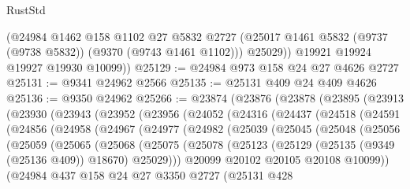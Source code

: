 \begin{lexlean}{RustStd}
\begin{coremodule}
          (@24984
            @1462
            @158
            @1102
            @27
            @5832
            @2727
            (@25017 @1461 @5832 (@9737 (@9738 @5832)) (@9370 (@9743 @1461 @1102)))
            @25029))
        @19921
        @19924
        @19927
        @19930
        @10099))
@25129 := @24984 @973 @158 @24 @27 @4626 @2727
@25131 := @9341 @24962 @2566
@25135 := @25131 @409 @24 @409 @4626
@25136 := @9350 @24962
@25266 := @23874
    (@23876
      (@23878
        (@23895
          (@23913
            (@23930
              (@23943
                (@23952
                  (@23956
                    (@24052
                      (@24316
                        (@24437
                          (@24518
                            (@24591
                              (@24856
                                (@24958
                                  (@24967
                                    (@24977
                                      (@24982
                                        (@25039
                                          (@25045
                                            (@25048
                                              (@25056
                                                (@25059
                                                  (@25065
                                                    (@25068
                                                      (@25075
                                                        (@25078
                                                          (@25123
                                                            (@25129
                                                              (@25135 (@9349 (@25136 @409)) @18670)
                                                              @25029)))
                                                        @20099
                                                        @20102
                                                        @20105
                                                        @20108
                                                        @10099))
                                                    (@24984
                                                      @437
                                                      @158
                                                      @24
                                                      @27
                                                      @3350
                                                      @2727
                                                      (@25131
                                                        @428

\end{coremodule}
\end{lexlean}

